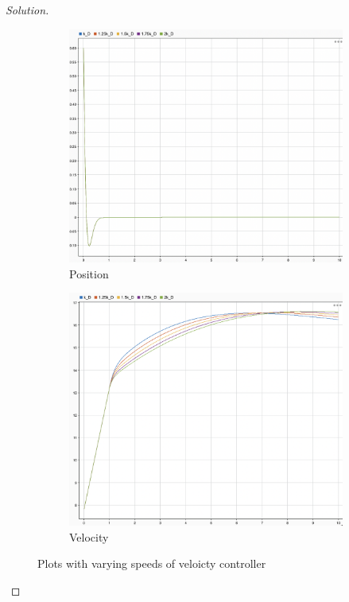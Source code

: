 \documentclass{article}
\begin{document}
\begin{proof}[Solution]
  \begin{figure}[h!]
    \centering
    \begin{subfigure}{0.4\linewidth}
      \includegraphics[width=\linewidth]{img24.png}
      \caption{Position}
    \end{subfigure}
    \begin{subfigure}{0.4\linewidth}
      \includegraphics[width=\linewidth]{img25.png}
      \caption{Velocity}
    \end{subfigure}
    \caption{Plots with varying speeds of veloicty controller}
\end{figure}

\end{proof}
\end{document}
